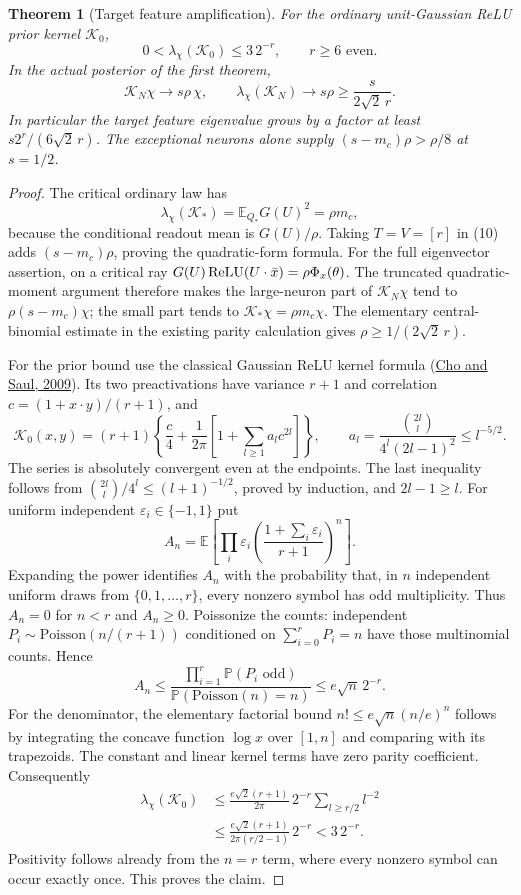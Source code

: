 \documentclass[11pt]{article}
\newtheorem{theorem}{Theorem}\newtheorem{lemma}[theorem]{Lemma}
\newcommand{\E}{\mathbb E}\newcommand{\Pp}{\mathbb P}
\begin{document}
\begin{theorem}[Target feature amplification]
For the ordinary unit-Gaussian ReLU prior kernel $\mathcal K_0$,
\[
 0<\lambda_\chi(\mathcal K_0)\le3\,2^{-r},\qquad r\ge6\text{ even}.
\]
In the actual posterior of the first theorem,
\[
 \mathcal K_N\chi\longrightarrow s\rho\,\chi,\qquad
 \lambda_\chi(\mathcal K_N)\longrightarrow s\rho
 \ge \frac{s}{2\sqrt2\,r}.
\]
In particular the target feature eigenvalue grows by a factor at least
$s2^r/(6\sqrt2\,r)$. The exceptional neurons alone supply
$(s-m_c)\rho>\rho/8$ at $s=1/2$.
\end{theorem}
\begin{proof}
The critical ordinary law has
\[
 \lambda_\chi(\mathcal K_*)=\E_{Q_*}G(U)^2=\rho m_c,
\]
because the conditional readout mean is $G(U)/\rho$. Taking $T=V=[r]$
in (10) adds $(s-m_c)\rho$, proving the quadratic-form formula.
For the full eigenvector assertion, on a critical ray
$G(U)\operatorname{ReLU}(U\cdot\bar x)=\rho\Phi_x(\theta)$.
The truncated quadratic-moment argument therefore makes the large-neuron
part of $\mathcal K_N\chi$ tend to $\rho(s-m_c)\chi$; the small
part tends to $\mathcal K_*\chi=\rho m_c\chi$.
The elementary
central-binomial estimate in the existing parity calculation gives
$\rho\ge1/(2\sqrt2\,r)$.

For the prior bound use the classical Gaussian ReLU kernel formula
(\href{https://proceedings.neurips.cc/paper/2009/file/5751ec3e9a4feab575962e78e006250d-Paper.pdf}{Cho and Saul, 2009}). Its two preactivations
have variance $r+1$ and correlation $c=(1+x\cdot y)/(r+1)$, and
\[
 \mathcal K_0(x,y)=(r+1)\left\{\frac c4+
 \frac1{2\pi}\left[1+\sum_{l\ge1}a_lc^{2l}\right]\right\},\qquad
 a_l=\frac{\binom{2l}{l}}{4^l(2l-1)^2}\le l^{-5/2}.
\]
The series is absolutely convergent even at the endpoints. The last
inequality follows from
$\binom{2l}{l}/4^l\le(l+1)^{-1/2}$, proved by induction, and
$2l-1\ge l$.
For uniform independent $\varepsilon_i\in\{-1,1\}$ put
\[
 A_n=\E\left[\prod_i\varepsilon_i
      \left(\frac{1+\sum_i\varepsilon_i}{r+1}\right)^n\right].
\]
Expanding the power identifies $A_n$ with the probability that, in $n$
independent uniform draws from $\{0,1,\ldots,r\}$, every nonzero symbol
has odd multiplicity. Thus $A_n=0$ for $n<r$ and $A_n\ge0$.
Poissonize the counts: independent $P_i\sim\mathrm{Poisson}(n/(r+1))$
conditioned on $\sum_{i=0}^rP_i=n$ have those multinomial counts. Hence
\[
 A_n\le\frac{\prod_{i=1}^r\Pp(P_i\text{ odd})}
                    {\Pp(\mathrm{Poisson}(n)=n)}
     \le e\sqrt n\,2^{-r}.
\]
For the denominator, the elementary factorial bound
$n!\le e\sqrt n(n/e)^n$ follows by integrating the concave function
$\log x$ over $[1,n]$ and comparing with its trapezoids.
The constant and linear kernel terms have zero parity coefficient.
Consequently
\begin{align*}
 \lambda_\chi(\mathcal K_0)
 &\le\frac{e\sqrt2(r+1)}{2\pi}\,2^{-r}
                \sum_{l\ge r/2}l^{-2}\\
 &\le\frac{e\sqrt2(r+1)}{2\pi(r/2-1)}\,2^{-r}
 <3\,2^{-r}.
\end{align*}
Positivity follows already from the $n=r$ term, where every nonzero
symbol can occur exactly once. This proves the claim.
\end{proof}
\end{document}
